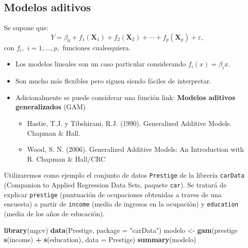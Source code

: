 \documentclass[]{book}
\newenvironment{Shaded}{\begin{snugshade}}{\end{snugshade}}
\newcommand{\KeywordTok}[1]{\textcolor[rgb]{0.13,0.29,0.53}{\textbf{#1}}}
\newcommand{\DataTypeTok}[1]{\textcolor[rgb]{0.13,0.29,0.53}{#1}}
\newcommand{\StringTok}[1]{\textcolor[rgb]{0.31,0.60,0.02}{#1}}
\newcommand{\OperatorTok}[1]{\textcolor[rgb]{0.81,0.36,0.00}{\textbf{#1}}}
\newcommand{\NormalTok}[1]{#1}
\begin{document}
\subsection{Modelos aditivos}\label{modelos-aditivos}

Se supone que:
\[Y=\beta_{0}+f_{1}\left(  \mathbf{X}_{1}\right)  +f_{2}\left(  \mathbf{X}_{2}\right)  +\cdots+f_{p}\left(  \mathbf{X}_{p}\right)  +\varepsilon\text{,}\]
con \(f_{i},\) \(i=1,...,p,\) funciones cualesquiera.

\begin{itemize}
\item
  Los modelos lineales son un caso particular considerando
  \(f_{i}(x) = \beta_{i}x\).
\item
  Son mucho más flexibles pero siguen siendo fáciles de interpretar.
\item
  Adicionalmente se puede considerar una función link: \textbf{Modelos
  aditivos generalizados} (GAM)

  \begin{itemize}
  \item
    Hastie, T.J. y Tibshirani, R.J. (1990). Generalized Additive Models.
    Chapman \& Hall.
  \item
    Wood, S. N. (2006). Generalized Additive Models: An Introduction
    with R. Chapman \& Hall/CRC
  \end{itemize}
\end{itemize}

Utilizaremos como ejemplo el conjunto de datos \texttt{Prestige} de la
librería \texttt{carData} (Companion to Applied Regression Data Sets,
paquete \texttt{car}). Se tratará de explicar \texttt{prestige}
(puntuación de ocupaciones obtenidas a traves de una encuesta) a partir
de \texttt{income} (media de ingresos en la ocupación) y
\texttt{education} (media de los años de educación).

\begin{Shaded}
\begin{Highlighting}[]
\KeywordTok{library}\NormalTok{(mgcv)}
\KeywordTok{data}\NormalTok{(Prestige, }\DataTypeTok{package =} \StringTok{"carData"}\NormalTok{)}
\NormalTok{modelo <-}\StringTok{ }\KeywordTok{gam}\NormalTok{(prestige }\OperatorTok{~}\StringTok{ }\KeywordTok{s}\NormalTok{(income) }\OperatorTok{+}\StringTok{ }\KeywordTok{s}\NormalTok{(education), }\DataTypeTok{data =}\NormalTok{ Prestige)}
\KeywordTok{summary}\NormalTok{(modelo)}
\end{Highlighting}
\end{Shaded}
\end{document}

